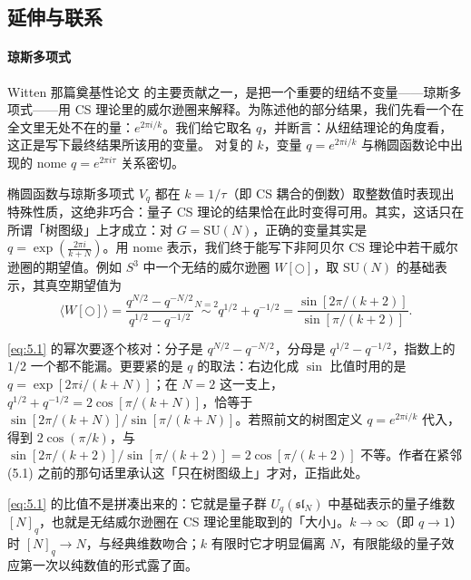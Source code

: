 \subsection{延伸与联系}\label{sec:5.2}

\paragraph{琼斯多项式}
Witten 那篇奠基性论文 \cite{witten1989} 的主要贡献之一，是把一个重要的纽结不变量——琼斯多项式——用 CS 理论里的威尔逊圈来解释。为陈述他的部分结果，我们先看一个在全文里无处不在的量：$e^{2\pi i/k}$。我们给它取名 $q$，并断言：从纽结理论的角度看，这正是写下最终结果所该用的变量。
对复的 $k$，变量 $q=e^{2\pi i/k}$ 与椭圆函数论中出现的 nome $q=e^{2\pi i\tau}$ 关系密切。

椭圆函数与琼斯多项式 $V_q$ 都在 $k=1/\tau$（即 CS 耦合的倒数）取整数值时表现出特殊性质，这绝非巧合：量子 CS 理论的结果恰在此时变得可用。其实，这话只在所谓「树图级」上才成立：对 $G=\mathrm{SU}(N)$，正确的变量其实是 $q=\exp\left(\frac{2\pi i}{k+N}\right)$。用 nome 表示，我们终于能写下非阿贝尔 CS 理论中若干威尔逊圈的期望值。例如 $S^3$ 中一个无结的威尔逊圈 $W[\bigcirc]$，取 $\mathrm{SU}(N)$ 的基础表示，其真空期望值为
\begin{equation}\tag{5.1}\label{eq:5.1}
  \langle W[\bigcirc]\rangle
  = \frac{q^{N/2}-q^{-N/2}}{q^{1/2}-q^{-1/2}}
  \overset{N=2}{\sim} q^{1/2}+q^{-1/2}
  = \frac{\sin[2\pi/(k+2)]}{\sin[\pi/(k+2)]} .
\end{equation}

\begin{yizhu}[易错点]
\eqref{eq:5.1} 的幂次要逐个核对：分子是 $q^{N/2}-q^{-N/2}$，分母是 $q^{1/2}-q^{-1/2}$，指数上的 $1/2$ 一个都不能漏。更要紧的是 $q$ 的取法：右边化成 $\sin$ 比值时用的是 $q=\exp[2\pi i/(k+N)]$；在 $N=2$ 这一支上，$q^{1/2}+q^{-1/2}=2\cos[\pi/(k+N)]$，恰等于 $\sin[2\pi/(k+N)]/\sin[\pi/(k+N)]$。若照前文的树图定义 $q=e^{2\pi i/k}$ 代入，得到 $2\cos(\pi/k)$，与 $\sin[2\pi/(k+2)]/\sin[\pi/(k+2)]=2\cos[\pi/(k+2)]$ 不等。作者在紧邻 (5.1) 之前的那句话里承认这「只在树图级上」才对，正指此处。
\end{yizhu}

\begin{yizhu}[物理图像]
\eqref{eq:5.1} 的比值不是拼凑出来的：它就是量子群 $U_q(\mathfrak{sl}_N)$ 中基础表示的量子维数 $[N]_q$，也就是无结威尔逊圈在 CS 理论里能取到的「大小」。$k\to\infty$（即 $q\to1$）时 $[N]_q\to N$，与经典维数吻合；$k$ 有限时它才明显偏离 $N$，有限能级的量子效应第一次以纯数值的形式露了面。
\end{yizhu}

